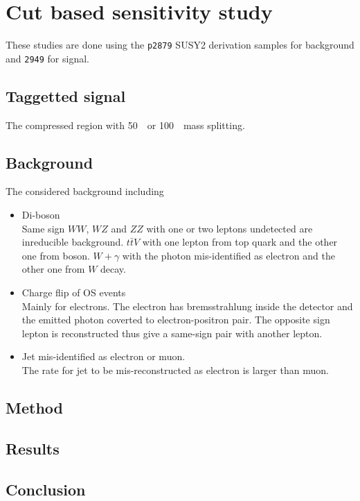\clearpage
\section{Cut based sensitivity study}
These studies are done using the \verb+p2879+ SUSY2 derivation samples for background and \verb+2949+ for signal.


\subsection{Taggetted signal}
The compressed region with 50~\GeV\ or 100~\GeV\ mass splitting.

\subsection{Background}
The considered background including
\begin{itemize}
  \item Di-boson\\
    Same sign $WW$, $WZ$ and $ZZ$ with one or two leptons undetected are inreducible background. $t\bar{t}V$ with one lepton from top quark and the other one from boson. $W+\gamma$ with the photon mis-identified as electron and the other one from $W$ decay.
  \item Charge flip of OS events\\
    Mainly for electrons. The electron has bremsstrahlung inside the detector and the emitted photon coverted to electron-positron pair. The opposite sign lepton is reconstructed thus give a same-sign pair with another lepton.
  \item Jet mis-identified as electron or muon.\\
    The rate for jet to be mis-reconstructed as electron is larger than muon.
\end{itemize}

\subsection{Method}

\subsection{Results}

\subsection{Conclusion}

